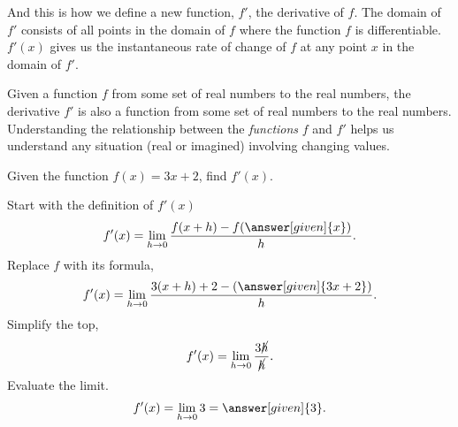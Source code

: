 \documentclass{ximera}
\begin{document}
And this is how we define a new function, $f'$, the derivative of $f$. The domain of $f'$ consists of all points in the domain of $f$ where the function $f$ is differentiable.
$f'(x)$ gives us the instantaneous rate of change of $f$ at any point $x$ in the domain of $f'$.\\
\begin{comment}
\begin{warning}
  The notation:
  \begin{quote}
  $f'(a)$ means take the derivative of $f$ first, then evaluate at
    $x=a$.
  \end{quote}
  In other words, given $f$ a function of $x$
  \[
  f'(a) = \eval{\ddx f(x)}_{x=a}.
  \]
\end{warning}
\end{comment}
Given a function $f$ from  some set of real numbers to the real numbers, the
derivative $f'$ is also a function from some set of real numbers to the real
numbers. Understanding the relationship between the \textit{functions}
$f$ and $f'$ helps us understand any situation (real or imagined)
involving changing values.
\begin{comment}
\begin{question}
  Let $f(x) = 3x+2$. What is $f'(-1)$?
  \begin{multipleChoice}
    \choice{$f'(-1) = 0$ because $f'(3)$ is a number, and a number corresponds to a horizontal line, which has a slope of zero.}
    \choice[correct]{$f'(-1) = 3$ because $y=f(x)$ is a line with slope $3$.}
    \choice{We cannot solve this problem yet.}
  \end{multipleChoice}
\end{question}
\end{comment}
\begin{example}
	Given the function $f(x) = 3x+2$, find  $f'(x)$. \\
	
	\begin{explanation}
		Start with the definition of $f'(x)$
		\[
		f'(x) = \lim_{h\to0}\frac{f(x+h)-f(\answer[given]{x})}{h}.
		\]
		Replace $f$ with its formula,
		\[
		f'(x) = \lim_{h\to0}\frac{3(x+h)+2-\left(\answer[given]{3x+2}\right)}{h}.
		\]
		Simplify the top,
		\[
		f'(x) = \lim_{h\to0}\frac{3\cancel{h}}{\cancel{h}}.
		\]
		Evaluate the limit.		
		\[
		f'(x) = \lim_{h\to0}{3}=\answer[given]{3}.
		\]

		
	\end{explanation}
\end{example}
\end{document}
